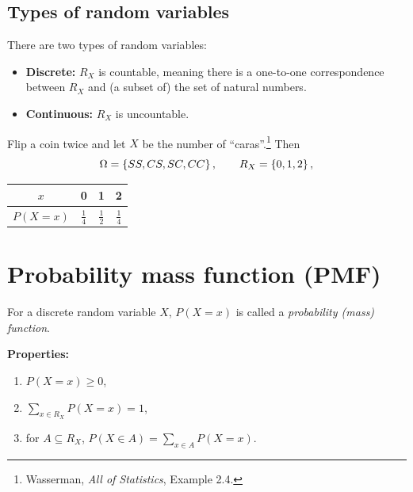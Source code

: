 \subsection{Types of random variables}
There are two types of random variables:
\begin{itemize}
\item \textbf{Discrete:} $R_X$ is countable, meaning there is a one-to-one correspondence between $R_X$ and (a subset of) the set of natural numbers.
\item \textbf{Continuous:} $R_X$ is uncountable.
\end{itemize}

\begin{example}
Flip a coin twice and let $X$ be the number of ``caras''.\footnote{Wasserman, \emph{All of Statistics}, Example 2.4.} Then
\[
\Omega = \left\{SS, CS, SC, CC\right\}, \qquad R_X = \left\{0,1,2\right\},
\]
\begin{center}
\begin{tabular}{c|ccc}
$x$ & 0 & 1 & 2\\ \hline
$P(X=x)$ & $\frac14$ & $\frac12$ & $\frac14$
\end{tabular}
\qquad\qquad
{}
\end{center}
\end{example}

\section{Probability mass function (PMF)}
For a discrete random variable $X$, $P(X = x)$ is called a \emph{probability (mass) function}.

\textbf{Properties:}
\begin{enumerate}[label=(\roman*)]
\item $P(X = x) \ge 0$,
\item $\sum_{x \in R_X} P(X = x) = 1$,
\item for $A \subseteq R_X$, $P(X \in A) = \sum_{x \in A} P(X = x)$.
\end{enumerate}


